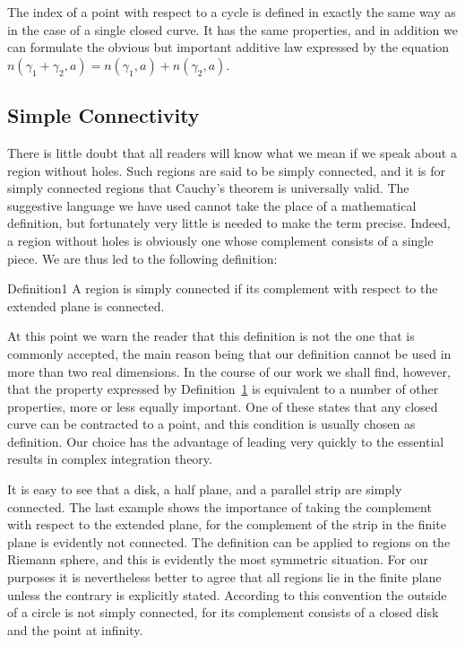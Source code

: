 The index of a point with respect to a cycle is defined in exactly the same way as in the case of a single closed curve. It has the same properties, and in addition we can formulate the obvious but important additive law expressed by the equation $n(\gamma_{1} + \gamma_{2}, a) = n(\gamma_{1}, a) + n(\gamma_{2}, a)$.

\setcounter{section}{4}\setcounter{subsection}{1}\subsection{Simple Connectivity}\label{sec:4.4.2}
There is little doubt that all readers will know what we mean if we speak about a region without holes. Such regions are said to be simply connected, and it is for simply connected regions that Cauchy's theorem is universally valid. The suggestive language we have used cannot take the place of a mathematical definition, but fortunately very little is needed to make the term precise. Indeed, a region without holes is obviously one whose complement consists of a single piece. We are thus led to the following definition:


\begin{originalstatement}{Definition}{1}\label{def:4.1}
A region is simply connected if its complement with respect to the extended plane is connected.
\end{originalstatement}
At this point we warn the reader that this definition is not the one that is commonly accepted, the main reason being that our definition cannot be used in more than two real dimensions. In the course of our work we shall find, however, that the property expressed by Definition~\hyperref[def:4.1]{1} is equivalent to a number of other properties, more or less equally important. One of these states that any closed curve can be contracted to a point, and this condition is usually chosen as definition. Our choice has the advantage of leading very quickly to the essential results in complex integration theory.

It is easy to see that a disk, a half plane, and a parallel strip are simply connected. The last example shows the importance of taking the complement with respect to the extended plane, for the complement of the strip in the finite plane is evidently not connected. The definition can be applied to regions on the Riemann sphere, and this is evidently the most symmetric situation. For our purposes it is nevertheless better to agree that all regions lie in the finite plane unless the contrary is explicitly stated. According to this convention the outside of a circle is not simply connected, for its complement consists of a closed disk and the point at infinity.

